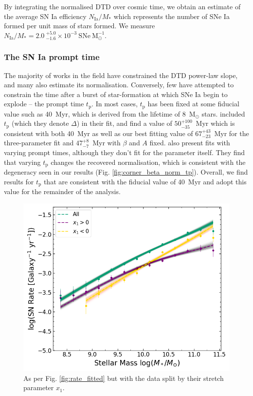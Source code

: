 \documentclass[fleqn,usenatbib]{mnras}
\begin{document}
By integrating the normalised DTD over cosmic time, we obtain an estimate of the average SN Ia efficiency $N_{\mathrm{Ia}}/M_*$ which represents the number of SNe Ia formed per unit mass of stars formed. We measure $N_{\mathrm{Ia}}/M_* = 2.0~_{-1.6}^{+5.0} \times 10^{-3}~\mathrm{SNe}~\mathrm{M}_{\odot}^{-1}$. 



\subsubsection{The SN Ia prompt time \label{subsubsec:compare_tp}}

The majority of works in the field have constrained the DTD power-law slope, and many also estimate its normalisation. Conversely, few have attempted to constrain the time after a burst of star-formation at which SNe Ia begin to explode -- the prompt time $t_{\mathrm{p}}$. In most cases, $t_{\mathrm{p}}$ has been fixed at some fiducial value such as 40~Myr, which is derived from the lifetime of 8~M$_{\odot}$ stars. \citet{Castrillo2020} included $t_{\mathrm{p}}$ (which they denote $\Delta$) in their fit, and find a value of $50_{-35}^{+100}$~Myr which is consistent with both 40~Myr as well as our best fitting value of $67_{-23}^{+43}$~Myr for the three-parameter fit and $47_{-7}^{+8}$~Myr with $\beta$ and $A$ fixed. \citet{Heringer2019} also present fits with varying prompt times, although they don't fit for the parameter itself. They find that varying $t_{\mathrm{p}}$ changes the recovered normalisation, which is consistent with the degeneracy seen in our results (Fig. \ref{fig:corner_beta_norm_tp}). Overall, we find results for $t_{\mathrm{p}}$ that are consistent with the fiducial value of 40~Myr and adopt this value for the remainder of the analysis.

\begin{figure}
    \centering
    \includegraphics[width=.5\textwidth]{figs/rate_vs_mass_DTD_fit_beta_norm_Qerf1.1_split_x1.png}
    \caption{As per Fig. \ref{fig:rate_fitted} but with the data split by their stretch parameter $x_1$.%
    \label{fig:rate_fitted_split_x1}}
\end{figure}
\end{document}
